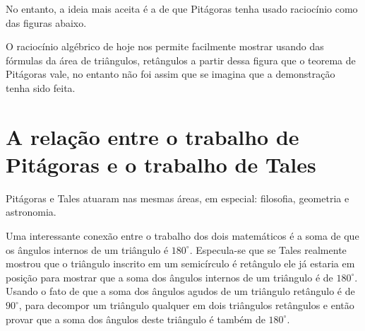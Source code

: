 \documentclass{article}
\begin{document}
\begin{center}
\end{center}

No entanto, a ideia mais aceita é a de que Pitágoras tenha usado raciocínio
como das figuras abaixo.

\begin{center}
\end{center}

O raciocínio algébrico de hoje nos permite facilmente mostrar usando
das fórmulas da área de triângulos, retângulos a partir dessa
figura que o teorema de Pitágoras vale, no entanto não foi assim
que se imagina que a demonstração tenha sido feita.


\section{A relação entre o trabalho de Pitágoras e o trabalho de Tales}

Pitágoras e Tales atuaram nas mesmas áreas, em especial: filosofia, geometria e
astronomia. 

Uma interessante conexão entre o trabalho dos dois matemáticos é a soma de que
os ângulos internos de um triângulo é $180^\circ$. Especula-se que se Tales 
realmente mostrou que o triângulo inscrito em um semicírculo é retângulo ele
já estaria em posição para mostrar que a soma dos ângulos internos de um triângulo
é de $180^\circ$. Usando o fato de que a soma dos ângulos agudos de um 
triângulo retângulo é de $90^\circ$, para decompor um triângulo qualquer em dois
triângulos retângulos e então provar que a soma dos ângulos deste triângulo é
também de $180^\circ$.
\end{document}
